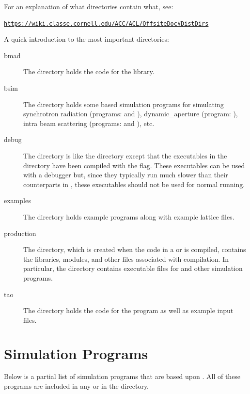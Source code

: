 \documentclass{hitec}
\newenvironment{display}
  {\vspace*{-1.5ex} \begin{alltt}}
  {\end{alltt} \vspace*{-1.0ex}}
\begin{document}
For an explanation of what directories contain what, see:
\begin{display}
  \url{https://wiki.classe.cornell.edu/ACC/ACL/OffsiteDoc#DistDirs}
\end{display}

A quick introduction to the most important directories:
  \begin{description}
  \item[bmad] \Newline
The  directory holds the code for the \bmad library.
  \item[bsim] \Newline
The  directory holds some \bmad based simulation programs for simulating
synchrotron radiation (programs:  and ), dynamic_aperture
(program: ), intra beam scattering (programs:  and
), etc.
  \item[debug] \Newline
The  directory is like the  directory except that the executables
in the  directory have been compiled with the  flag. These executables
can be used with a debugger but, since they typically run much slower than their counterparts in
, these executables should not be used for normal running.
  \item[examples] \Newline
The  directory holds example programs along with example lattice files.
  \item[production] \Newline
The  directory, which is created when the code in a  or
 is compiled, contains the libraries, modules, and other files associated with
compilation. In particular, the  directory contains executable files
for \tao and other simulation programs.

  \item[tao] \Newline
The  directory holds the code for the \tao program as well as example input
files.
  \end{description}

\section{Simulation Programs}

Below is a partial list of simulation programs that are based upon \bmad. All of these
programs are included in any  or  in the 
directory.
\end{document}

